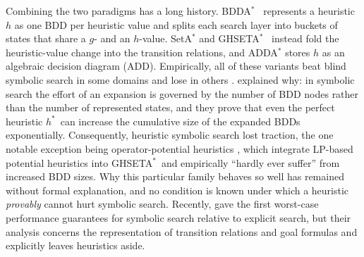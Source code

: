 \documentclass[letterpaper]{article}
\newcommand{\hstar}{\ensuremath{h^{*}}}
\newcommand{\bddastar}{BDDA\ensuremath{^{*}}}
\newcommand{\ghseta}{GHSETA\ensuremath{^{*}}}
\theoremstyle{plain}
\theoremstyle{definition}
\theoremstyle{remark}
\begin{document}
Combining the two paradigms has a long history. \bddastar\
\citep{edelkamp-reffel-ki1998} represents a heuristic $h$ as one BDD per
heuristic value and splits each search layer into buckets of states that
share a $g$- and an $h$-value. SetA\ensuremath{^{*}} and \ghseta\
\citep{jensen-et-al-aij2008} instead fold the heuristic-value change into
the transition relations, and ADDA\ensuremath{^{*}}
\citep{hansen-et-al-sara2002} stores $h$ as an algebraic decision diagram
(ADD). Empirically, all of these variants beat blind symbolic search in
some domains and lose in others
\citep{torralba-phd2015,torralba-et-al-aij2017}.
\citet{speck-et-al-icaps2020} explained why: in symbolic search the
effort of an expansion is governed by the number of BDD nodes rather than
the number of represented states, and they prove that even the perfect
heuristic \hstar\ can increase the cumulative size of the expanded BDDs
exponentially. Consequently, heuristic symbolic search lost traction, the
one notable exception being operator-potential heuristics
\citep{fiser-et-al-aaai2022,fiser-et-al-aij2024}, which integrate
LP-based potential heuristics \citep{pommerening-et-al-aaai2015} into
\ghseta\ and empirically ``hardly ever suffer'' from increased BDD sizes.
Why this particular family behaves so well has remained without formal
explanation, and no condition is known under which a heuristic
\emph{provably} cannot hurt symbolic search. Recently,
\citet{speck-helmert-ecai2025} gave the first worst-case performance
guarantees for symbolic search relative to explicit search, but their
analysis concerns the representation of transition relations and goal
formulas and explicitly leaves heuristics aside.
\end{document}
